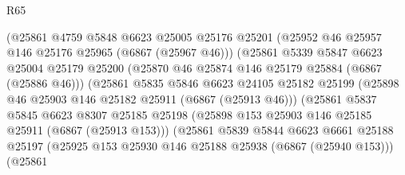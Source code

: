 \begin{lexlean}{R65}
\begin{coremodule}
{                                (@25861
                                  @4759
                                  @5848
                                  @6623
                                  @25005
                                  @25176
                                  @25201
                                  (@25952 @46 @25957 @146 @25176 @25965 (@6867 (@25967 @46)))
                                  (@25861
                                    @5339
                                    @5847
                                    @6623
                                    @25004
                                    @25179
                                    @25200
                                    (@25870 @46 @25874 @146 @25179 @25884 (@6867 (@25886 @46)))
                                    (@25861
                                      @5835
                                      @5846
                                      @6623
                                      @24105
                                      @25182
                                      @25199
                                      (@25898 @46 @25903 @146 @25182 @25911 (@6867 (@25913 @46)))
                                      (@25861
                                        @5837
                                        @5845
                                        @6623
                                        @8307
                                        @25185
                                        @25198
                                        (@25898
                                          @153
                                          @25903
                                          @146
                                          @25185
                                          @25911
                                          (@6867 (@25913 @153)))
                                        (@25861
                                          @5839
                                          @5844
                                          @6623
                                          @6661
                                          @25188
                                          @25197
                                          (@25925
                                            @153
                                            @25930
                                            @146
                                            @25188
                                            @25938
                                            (@6867 (@25940 @153)))
                                          (@25861
}
\end{coremodule}
\end{lexlean}
